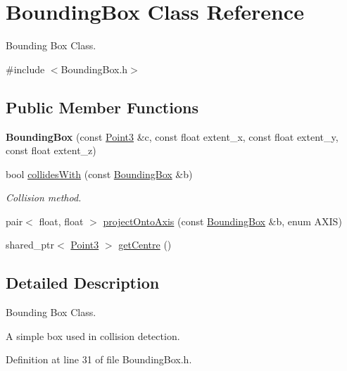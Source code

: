 \hypertarget{classBoundingBox}{\section{Bounding\-Box Class Reference}
\label{classBoundingBox}
}


Bounding Box Class.  




{\ttfamily \#include $<$Bounding\-Box.\-h$>$}

\subsection*{Public Member Functions}
\begin{DoxyCompactItemize}
\item 
\hypertarget{classBoundingBox_af06000fc84c707ac6fc5451c63de3480}{{\bfseries Bounding\-Box} (const \hyperlink{classVectormath_1_1Aos_1_1Point3}{Point3} \&c, const float extent\-\_\-x, const float extent\-\_\-y, const float extent\-\_\-z)}\label{classBoundingBox_af06000fc84c707ac6fc5451c63de3480}

\item 
bool \hyperlink{classBoundingBox_a90418b763701826c706178845903dd7c}{collides\-With} (const \hyperlink{classBoundingBox}{Bounding\-Box} \&b)
\begin{DoxyCompactList}\small\item\em Collision method. \end{DoxyCompactList}\item 
pair$<$ float, float $>$ \hyperlink{classBoundingBox_a20a8d578fbfd1702e183921f9ec0a0d2}{project\-Onto\-Axis} (const \hyperlink{classBoundingBox}{Bounding\-Box} \&b, enum A\-X\-I\-S)
\item 
shared\-\_\-ptr$<$ \hyperlink{classVectormath_1_1Aos_1_1Point3}{Point3} $>$ \hyperlink{classBoundingBox_aceef7769498825680d34638bccc6f490}{get\-Centre} ()
\end{DoxyCompactItemize}


\subsection{Detailed Description}
Bounding Box Class. 

A simple box used in collision detection. 

Definition at line 31 of file Bounding\-Box.\-h.



